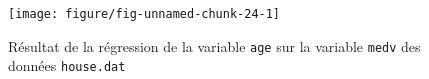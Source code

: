 \begin{solution}{2.17}
\begin{enumerate}
\begin{figure}
\begin{knitrout}
\color{fgcolor}\begin{kframe}
\begin{alltt}
 \hlkwb{<-} \hlopt{$}
 \hlopt{~}     \hlstd{=} 
\hlopt{$}
         \hlstd{=} \hlstd{,}  \hlstd{=} \hlstd{(}\hlstd{,} \hlstd{,} \hlstd{),}  \hlstd{=} \hlstd{,}
         \hlstd{=} \hlstd{,}  \hlstd{=} \hlstd{)}
\end{alltt}
\end{kframe}

{\centering \texttt{[image: figure/fig-unnamed-chunk-24-1]}

}



\end{knitrout}
        \caption{Résultat de la régression de la variable \texttt{age} sur la variable \texttt{medv} des données \texttt{house.dat}}
        \label{fig:simple:house3}
      \end{figure}
    \end{enumerate}
  
\end{solution}
